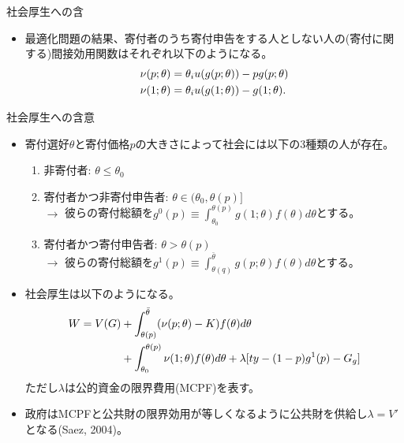 \documentclass[dvipdfmx,10pt]{beamer}
\begin{document}
\begin{frame}{社会厚生への含}
	\begin{itemize}
	\item 最適化問題の結果、寄付者のうち寄付申告をする人としない人の(寄付に関する)間接効用関数はそれぞれ以下のようになる。
	\begin{align}
		\nu(p;\theta)&=\theta_i u(g(p;\theta))-pg(p;\theta)\notag\\
		\nu(1;\theta)&=\theta_i u(g(1;\theta))-g(1;\theta)\notag.
	\end{align}
\end{itemize}
\end{frame}

\begin{frame}{社会厚生への含意}
	\begin{itemize}
		\item 寄付選好$\theta$と寄付価格$p$の大きさによって社会には以下の3種類の人が存在。
		\begin{enumerate}
			\item 非寄付者: $\theta\le \theta_0$
			\item 寄付者かつ非寄付申告者: $\theta\in(\theta_0,\theta(p)]$\\
			$\to$ 彼らの寄付総額を$g^0(p)\equiv\int_{\theta_0}^{\theta(p)}g(1;\theta)f(\theta)d\theta$とする。
			\item 寄付者かつ寄付申告者: $\theta>\theta(p)$\\
			$\to$ 彼らの寄付総額を$g^1(p)\equiv\int_{\theta(q)}^{\bar{\theta}}g(p;\theta)f(\theta)d\theta$とする。
		\end{enumerate}
	\item 社会厚生は以下のようになる。
	\begin{align}
		W=V(G)&+\int_{\theta(p)}^{\bar{\theta}}(\nu(p;\theta)-K)f(\theta)d\theta\notag\\
		&+\int_{\theta_0}^{\theta(p)}\nu(1;\theta)f(\theta)d\theta+\lambda[ty-(1-p)g^1(p)-G_g]\notag
	\end{align}
	ただし$\lambda$は公的資金の限界費用(MCPF)を表す。
	\item 政府はMCPFと公共財の限界効用が等しくなるように公共財を供給し$\lambda=V'$となる(Saez, 2004)。
	\end{itemize}
\end{frame}
\end{document}
